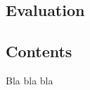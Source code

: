   \begin{titlepage}
    \vspace*{\fill}
      \part{Evaluation}
    \vspace*{\fill}
  \end{titlepage}

\chapter*{Contents}


Bla bla bla